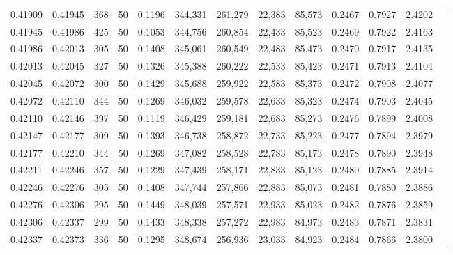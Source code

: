 \begin{tabular}{rrrrrrrrrrrrr}
0.41909 & 0.41945 &   368 &  50 &                                     0.1196 & 344,331 & 261,279 &  22,383 &  85,573 & 0.2467 & 0.7927 & 2.4202 \\
0.41945 & 0.41986 &   425 &  50 &                                     0.1053 & 344,756 & 260,854 &  22,433 &  85,523 & 0.2469 & 0.7922 & 2.4163 \\
0.41986 & 0.42013 &   305 &  50 &                                     0.1408 & 345,061 & 260,549 &  22,483 &  85,473 & 0.2470 & 0.7917 & 2.4135 \\
0.42013 & 0.42045 &   327 &  50 &                                     0.1326 & 345,388 & 260,222 &  22,533 &  85,423 & 0.2471 & 0.7913 & 2.4104 \\
0.42045 & 0.42072 &   300 &  50 &                                     0.1429 & 345,688 & 259,922 &  22,583 &  85,373 & 0.2472 & 0.7908 & 2.4077 \\
0.42072 & 0.42110 &   344 &  50 &                                     0.1269 & 346,032 & 259,578 &  22,633 &  85,323 & 0.2474 & 0.7903 & 2.4045 \\
0.42110 & 0.42146 &   397 &  50 &                                     0.1119 & 346,429 & 259,181 &  22,683 &  85,273 & 0.2476 & 0.7899 & 2.4008 \\
0.42147 & 0.42177 &   309 &  50 &                                     0.1393 & 346,738 & 258,872 &  22,733 &  85,223 & 0.2477 & 0.7894 & 2.3979 \\
0.42177 & 0.42210 &   344 &  50 &                                     0.1269 & 347,082 & 258,528 &  22,783 &  85,173 & 0.2478 & 0.7890 & 2.3948 \\
0.42211 & 0.42246 &   357 &  50 &                                     0.1229 & 347,439 & 258,171 &  22,833 &  85,123 & 0.2480 & 0.7885 & 2.3914 \\
0.42246 & 0.42276 &   305 &  50 &                                     0.1408 & 347,744 & 257,866 &  22,883 &  85,073 & 0.2481 & 0.7880 & 2.3886 \\
0.42276 & 0.42306 &   295 &  50 &                                     0.1449 & 348,039 & 257,571 &  22,933 &  85,023 & 0.2482 & 0.7876 & 2.3859 \\
0.42306 & 0.42337 &   299 &  50 &                                     0.1433 & 348,338 & 257,272 &  22,983 &  84,973 & 0.2483 & 0.7871 & 2.3831 \\
0.42337 & 0.42373 &   336 &  50 &                                     0.1295 & 348,674 & 256,936 &  23,033 &  84,923 & 0.2484 & 0.7866 & 2.3800 \\

\end{tabular}
